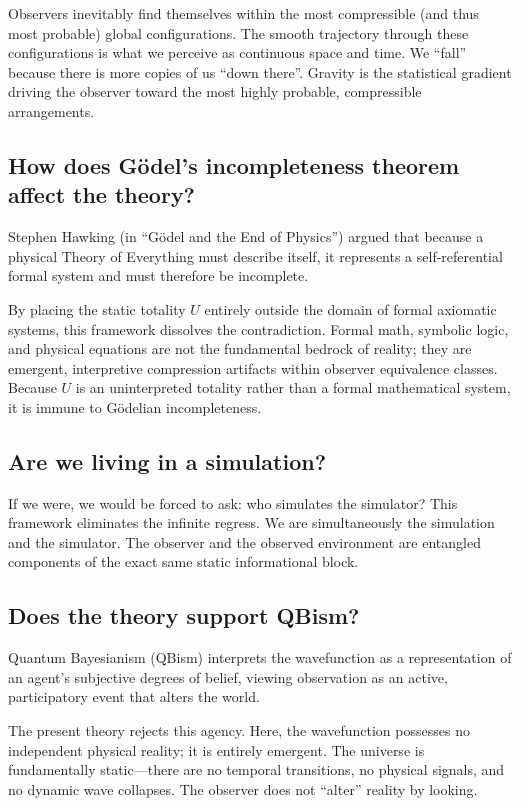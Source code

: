 Observers inevitably find themselves within the most compressible (and thus most probable) global configurations.
The smooth trajectory through these configurations is what we perceive as continuous space and time.
We ``fall'' because there is more copies of us ``down there''.
Gravity is the statistical gradient driving the observer toward the most highly probable, compressible arrangements.

\subsection*{How does Gödel's incompleteness theorem affect the theory?}

Stephen Hawking (in ``Gödel and the End of Physics'') argued that because a physical Theory of Everything must describe itself,
it represents a self-referential formal system and must therefore be incomplete. 

By placing the static totality $U$ entirely outside the domain of formal axiomatic systems, this framework dissolves the contradiction.
Formal math, symbolic logic, and physical equations are not the fundamental bedrock of reality; they are emergent,
interpretive compression artifacts within observer equivalence classes.
Because $U$ is an uninterpreted totality rather than a formal mathematical system, it is immune to Gödelian incompleteness.

\subsection*{Are we living in a simulation?}

If we were, we would be forced to ask: who simulates the simulator? This framework eliminates the infinite regress.
We are simultaneously the simulation and the simulator.
The observer and the observed environment are entangled components of the exact same static informational block.

\subsection*{Does the theory support QBism?}

Quantum Bayesianism (QBism) interprets the wavefunction as a representation of an agent’s subjective degrees of belief,
viewing observation as an active, participatory event that alters the world.

The present theory rejects this agency. Here, the wavefunction possesses no independent physical reality; it is entirely emergent.
The universe is fundamentally static—there are no temporal transitions, no physical signals, and no dynamic wave collapses.
The observer does not ``alter'' reality by looking.

